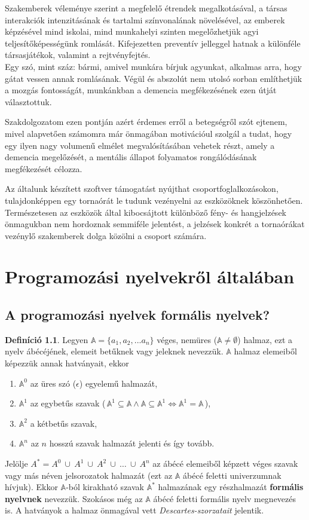\documentclass[tocnopagenum]{thesis-ekf}
\theoremstyle{definition}
\newtheorem{definicio}[tetel]{Definíció}
\theoremstyle{remark}
\begin{document}
	Szakemberek véleménye szerint a megfelelő étrendek megalkotásával, a társas interakciók intenzitásának és tartalmi színvonalának növelésével, az emberek képzésével mind iskolai, mind munkahelyi szinten megelőzhetjük agyi teljesítőképességünk romlását. 
	Kifejezetten preventív jelleggel hatnak a különféle társasjátékok, valamint a rejtvényfejtés.\\Egy szó, mint száz: bármi, amivel munkára bírjuk agyunkat, alkalmas arra, hogy gátat vessen annak romlásának.
	Végül és abszolút nem utolsó sorban említhetjük a mozgás fontosságát, munkánkban a demencia megfékezésének ezen útját választottuk.

	Szakdolgozatom ezen pontján azért érdemes erről a betegségről szót ejtenem, mivel alapvetően számomra már önmagában motivációul szolgál a tudat, hogy egy ilyen nagy volumenű elmélet megvalósításában vehetek részt, amely a demencia megelőzését, a mentális állapot folyamatos rongálódásának megfékezését célozza. 

	Az általunk készített szoftver támogatást nyújthat csoportfoglalkozásokon, tulajdonképpen egy tornaórát le tudunk vezényelni az eszközöknek köszönhetően. Természetesen az eszközök által kibocsájtott különböző fény- és hangjelzések önmagukban nem hordoznak semmiféle jelentést, a jelzések konkrét  a tornaórákat vezénylő szakemberek dolga közölni a csoport számára.
	
	\chapter{Programozási nyelvekről általában}
	\section{A programozási nyelvek formális nyelvek?}
	\begin{definicio}
		Legyen $\mathbb{A} = \{a_1, a_2, ... a_n\}$ véges, nemüres ($ \mathbb{A} \neq \emptyset$) halmaz, ezt a nyelv ábécéjének, elemeit betűknek vagy jeleknek nevezzük. $\mathbb{A}$ halmaz elemeiből képezzük annak hatványait, ekkor 
		\begin{enumerate}
			\item $\mathbb{A} ^ {0}$ az üres szó ($\epsilon$) egyelemű halmazát, 
			\item $\mathbb{A} ^ {1} $ az egybetűs szavak (\,$\mathbb{A}^{1}\subseteq\mathbb{A}\wedge\mathbb{A}\subseteq\mathbb{A}^{1} \iff \mathbb{A}^{1}=\mathbb{A}$\,), 
			\item $\mathbb{A}^{2}$ a kétbetűs szavak, 
			\item $\mathbb{A}^{n}$ az $n$ hosszú szavak halmazát jelenti és így tovább.
		\end{enumerate}
	Jelölje $A^{*}=A^{0}\ \cup\ A^{1}\ \cup\ A^{2}\ \cup\ \dots\ \cup\  A^{n}$ az ábécé elemeiből képzett véges szavak vagy más néven jelsorozatok halmazát (ezt az $\mathbb{A}$ ábécé feletti univerzumnak hívjuk). Ekkor  $\mathbb{A}$-ból kirakható szavak $\mathbb{A}^{*}$ halmazának egy részhalmazát \textbf{formális nyelvnek} nevezzük. Szokásos még az $\mathbb{A}$ ábécé feletti formális nyelv megnevezés is. A hatványok a halmaz önmagával vett \emph{Descartes-szorzatait} jelentik.
	\cite{formnyelvek}
	\end{definicio}
	
\end{document}
